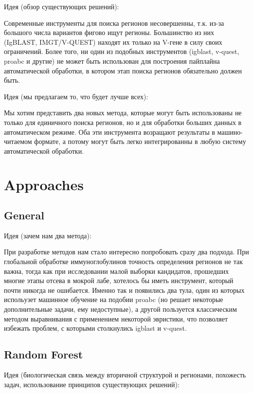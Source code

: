 \documentclass[a4paper,12pt]{article}
\begin{document}
  Идея (обзор существующих решений):

  Современные инструменты для поиска регионов несовершенны, т.к. из-за
  большого числа вариантов фигово ищут регионы. Большинство из них
  (IgBLAST, IMGT/V-QUEST) находят их только на V-гене в силу своих
  ограничений. Более того, ни один из подобных инструментов (igblast,
  v-quest, proabc и другие) не может быть использован для построения
  пайплайна автоматической обработки, в котором этап поиска регионов
  обязательно должен быть.

  Идея (мы предлагаем то, что будет лучше всех):

  Мы хотим представить два новых метода, которые могут быть
  использованы не только для единичного поиска регионов, но и для
  обработки больших данных в автоматическом режиме. Оба эти
  инструмента возращают результаты в машино-читаемом формате, а потому
  могут быть легко интегрированны в любую систему автоматической обработки.

  \section{Approaches}

  \subsection{General}

  Идея (зачем нам два метода):

  При разработке методов нам стало интересно попробовать сразу два
  подхода. При глобальной обработке иммуноглобулинов точность
  определения регионов не так важна, тогда как при исследовании малой
  выборки кандидатов, прошедших многие этапы отсева в мокрой лабе,
  хотелось бы иметь инструмент, который почти никогда не
  ошибается. Именно так и появились два тула, один из которых
  испольузет машинное обучение на подобии proabc (но решает некоторые
  дополнительные задачи, ему недоступные), а другой пользуется
  классическим методом выравнивания с применением некоторой эвристики,
  что позволяет избежать проблем, с которыми столкнулись igblast и v-quest.

  \subsection{Random Forest}

  Идея (биологическая связь между вторичной структурой и регионами,
  похожесть задач, использование принципов существующих решений):
\end{document}
